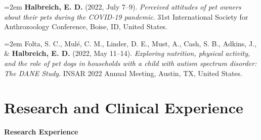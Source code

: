\documentclass[letter,11pt]{article}
\begin{document}
\hangindent=2em
\textbf{Halbreich, E. D.} (2022, July 7--9). \textit{Perceived attitudes of pet owners about their pets during the COVID-19 pandemic}. 31st International Society for Anthrozoology Conference, Boise, ID, United States.

\hangindent=2em
Folta, S. C., Mulé, C. M., Linder, D. E., Must, A., Cash, S. B., Adkins, J., \& \textbf{Halbreich, E. D.} (2022, May 11--14). \textit{Exploring nutrition, physical activity, and the role of pet dogs in households with a child with autism spectrum disorder: The DANE Study}. INSAR 2022 Annual Meeting, Austin, TX, United States.

\section{\textbf{Research and Clinical Experience}}
\vspace{-0.4mm}
\vspace{1mm}

\textbf{Research Experience}
\end{document}

